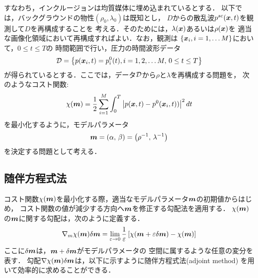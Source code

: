 すなわち，インクルージョンは均質媒体に埋め込まれているとする．
以下では，バックグラウンドの物性$(\rho_0, \lambda_0)$は既知とし，
$D$からの散乱波$p^{sc}(\mbox{\boldmath $x$},t)$を観測して$D$を再構成することを
考える．そのためには，$\lambda(\mbox{\boldmath $x$})$あるいは$\rho(\mbox{\boldmath $x$})$を
適当な画像化領域において再構成すればよい．なお，観測は
$\left\{ \mbox{\boldmath $x$}_i, i=1,\dots M\right\}$において，$0\leq  t\leq T$の
時間範囲で行い，圧力の時間波形データ
\begin{equation}
	{\cal D}
	=
	\left\{ 
		p(\mbox{\boldmath $x$}_i, t)=p_i^{0}(t), i=1,2,\dots M, \, 0\leq t \leq T
	\right\}
	\label{eqn:YYY_00}
\end{equation}
が得られているとする．ここでは，データ$\cal D$から$\rho$と$\lambda$を再構成する問題を，
次のようなコスト関数:
\begin{equation}
	\chi (\mbox{\boldmath $m$})=\frac{1}{2} 
	\sum_{i=1}^M\int_0^T \left| p(\mbox{\boldmath $x$},t)-p^0(\mbox{\boldmath $x$}_i,t))\right|^2dt
	\label{eqn:YYY_01}
\end{equation}
を最小化するように，モデルパラメータ
\begin{equation}
	\mbox{\boldmath $m$}=(\alpha,\,\beta)=\left( \rho^{-1},\, \lambda^{-1} \right)
	\label{eqn:YYY_02}
\end{equation}
を決定する問題として考える．
\subsection{随伴方程式法}
コスト関数$\chi(\mbox{\boldmath $m$})$を最小化する際，適当なモデルパラメータ$\mbox{\boldmath $m$}$の初期値からはじめ，
コスト関数の値が減少する方向へ$\mbox{\boldmath $m$}$を修正する勾配法を適用する．
$\chi(\mbox{\boldmath $m$})$の$\mbox{\boldmath $m$}$に関する勾配は，次のように定義する．
\begin{equation}
	\nabla_m \chi(\mbox{\boldmath $m$}) 
	\delta \mbox{\boldmath $m$}
	= \lim_{\varepsilon \rightarrow 0}
	\frac{1}{\varepsilon}
	\left[
		\chi(\mbox{\boldmath $m$}+\varepsilon \delta \mbox{\boldmath $m$}) - \chi(\mbox{\boldmath $m$})
	\right]
	\label{eqn:YYY_03}
\end{equation}
ここに$\delta \mbox{\boldmath $m$}$は，$\mbox{\boldmath $m$}+\delta \mbox{\boldmath $m$}$がモデルパラメータの
空間に属するような任意の変分を表す．
勾配$\nabla \chi (\mbox{\boldmath $m$})\delta \mbox{\boldmath $m$}$は，以下に示すように随伴方程式法(adjoint method)
を用いて効率的に求めることができる．

